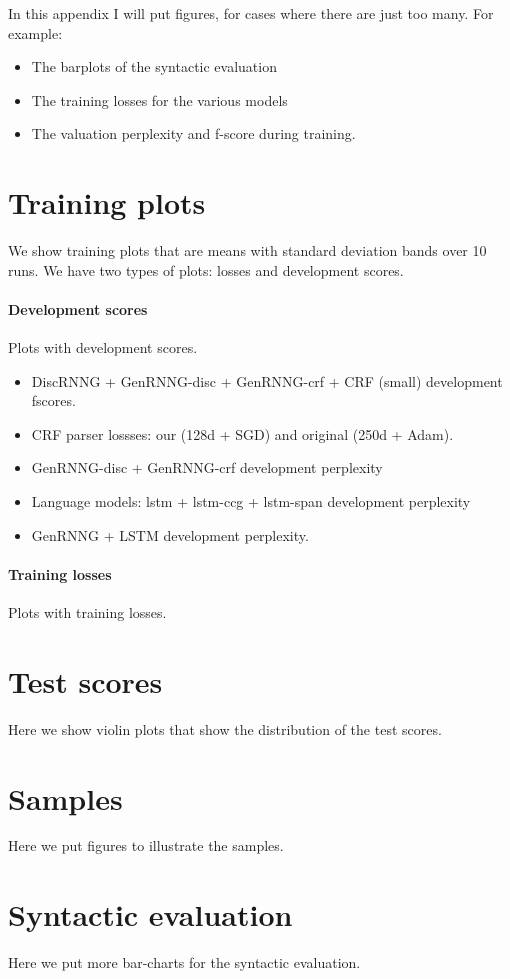 In this appendix I will put figures, for cases where there are just too many. For example:
\begin{itemize}
  \item The barplots of the syntactic evaluation
  \item The training losses for the various models
  \item The valuation perplexity and f-score during training.
\end{itemize}


\section{Training plots}
We show training plots that are means with standard deviation bands over 10 runs. We have two types of plots: losses and development scores.

\paragraph{Development scores} Plots with development scores.
\begin{itemize}
  \item DiscRNNG + GenRNNG-disc + GenRNNG-crf + CRF (small) development fscores.
  \item CRF parser lossses: our (128d + SGD) and original (250d + Adam).
  \item GenRNNG-disc + GenRNNG-crf development perplexity
  \item Language models: lstm + lstm-ccg + lstm-span development perplexity
  \item GenRNNG + LSTM development perplexity.
\end{itemize}

\paragraph{Training losses} Plots with training losses.


\section{Test scores}
Here we show violin plots that show the distribution of the test scores.


\section{Samples}
Here we put figures to illustrate the samples.


\section{Syntactic evaluation}
Here we put more bar-charts for the syntactic evaluation.
